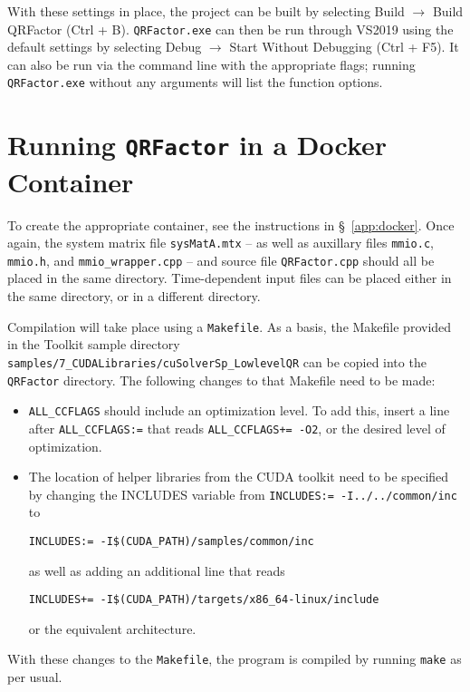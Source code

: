 \documentclass[11pt,letterpaper]{article}
\begin{document}
With these settings in place, the project can be built by selecting Build $\to$ Build 
QRFactor (Ctrl + B). \texttt{QRFactor.exe} can then be run through VS2019 using the default 
settings by selecting Debug $\to$ Start Without Debugging (Ctrl + F5). It can also be run 
via the command line with the appropriate flags; running \texttt{QRFactor.exe} without any
arguments will list the function options.

\section{Running \texttt{QRFactor} in a Docker Container}
\label{sec: docker}

To create the appropriate container, see the instructions in \S~\!\ref{app:docker}. Once again,
the system matrix file \verb+sysMatA.mtx+ -- as well as auxillary files \verb+mmio.c+, \verb+mmio.h+, 
and \verb+mmio_wrapper.cpp+ -- and source file \verb+QRFactor.cpp+ should all be placed in the
same directory. Time-dependent input files can be placed either in the same directory, or in a different directory.

Compilation will take place using a \verb+Makefile+. As a basis, the Makefile provided in the Toolkit sample 
directory \verb+samples/7_CUDALibraries/cuSolverSp_LowlevelQR+ can be copied into the \verb+QRFactor+ directory. The following
changes to that Makefile need to be made:
\begin{itemize}
  \item \verb+ALL_CCFLAGS+ should include an optimization level. To add this, insert a line after \verb+ALL_CCFLAGS:=+ that
  reads \verb.ALL_CCFLAGS+= -O2., or the desired level of optimization.
  \item The location of helper libraries from the CUDA toolkit need to be specified by changing the 
  INCLUDES variable from \verb_INCLUDES:= -I../../common/inc_ to
  \begin{center}
    \verb+INCLUDES:= -I$(CUDA_PATH)/samples/common/inc+
  \end{center} 
  as well as adding an additional line that reads 
  \begin{center}
    \verb.INCLUDES+= -I$(CUDA_PATH)/targets/x86_64-linux/include.
  \end{center} 
  or the equivalent architecture.
\end{itemize}

With these changes to the \verb+Makefile+, the program is compiled by running \verb+make+ as per usual.
\end{document}
